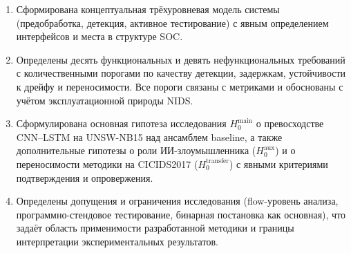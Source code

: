 \begin{enumerate}
    \item Сформирована концептуальная трёхуровневая модель системы
    (предобработка, детекция, активное тестирование) с явным определением
    интерфейсов и места в структуре SOC.
    \item Определены десять функциональных и девять нефункциональных
    требований с количественными порогами по качеству детекции, задержкам,
    устойчивости к дрейфу и переносимости. Все пороги связаны с метриками
     и обоснованы с учётом эксплуатационной природы
    NIDS.
    \item Сформулирована основная гипотеза исследования \(H_0^{\text{main}}\)
    о превосходстве CNN--LSTM на UNSW-NB15 над ансамблем baseline, а также
    дополнительные гипотезы о роли ИИ-злоумышленника
    (\(H_0^{\text{aux}}\)) и о переносимости методики на CICIDS2017
    (\(H_0^{\text{transfer}}\)) с явными критериями подтверждения и
    опровержения.
    \item Определены допущения и ограничения исследования (flow-уровень
    анализа, программно-стендовое тестирование, бинарная постановка как
    основная), что задаёт область применимости разработанной методики и
    границы интерпретации экспериментальных результатов.
\end{enumerate}
